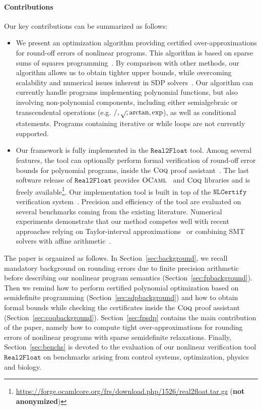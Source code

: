 \documentclass[preprint,fleqn,nocopyrightspace]{sigplanconf}
\newcommand{\realtofloat}{\mathtt{Real2Float}}
\newcommand{\coq}{\text{\sc Coq}}
\newcommand{\ocaml}{\text{\sc OCaml}}
\newcommand{\nlcertify}{\mathtt{NLCertify}}
\theoremstyle{plain}
\begin{document}
\paragraph{Contributions}
%
Our key contributions can be summarized as follows:
\begin{itemize}[noitemsep,nolistsep]
\item We present an optimization algorithm providing certified over-approximations for round-off errors of nonlinear programs. This algorithm is based on sparse sums of squares programming~\cite{Las06SparseSOS}. By comparison with other methods, our algorithm allows us to obtain tighter upper bounds, while overcoming scalability and numerical issues inherent in SDP solvers~\cite{Todd01semidefiniteoptimization}. Our algorithm can currently handle  programs implementing polynomial functions, but also involving non-polynomial components, including either semialgebraic or transcendental operations (e.g. $/, \sqrtsign, \arctan, \exp$), as well as conditional statements.  Programs containing iterative or while loops are not currently supported.
\item Our framework is fully implemented in the $\realtofloat$ tool.  Among several features, the tool can optionally perform formal verification of round-off error bounds for polynomial programs, inside the $\coq$ proof assistant~\cite{CoqProofAssistant}. The last software release of $\realtofloat$ provides $\ocaml$~\cite{OCaml} and $\coq$ libraries and is freely available\footnote{\url{https://forge.ocamlcore.org/frs/download.php/1526/real2float.tar.gz} (\textbf{not anonymized})}.
%
%
Our implementation tool is built in top of the $\nlcertify$ verification system~\cite{icms14}. Precision and efficiency of the tool are evaluated on several benchmarks coming from the existing literature. Numerical experiments demonstrate that our method competes well with recent approaches relying on Taylor-interval approximations~\cite{fptaylor15} or combining SMT solvers with affine arithmetic~\cite{Darulova14Popl}.
\end{itemize}
%


The paper is organized as follows.
%
In Section~\ref{sec:background}, we recall mandatory background on rounding errors due to finite precision arithmetic before describing our nonlinear program semantics (Section~\ref{sec:fpbackground}). Then we remind how to perform certified polynomial optimization based on semidefinite programming (Section~\ref{sec:sdpbackground}) and how to obtain formal bounds while checking the certificates inside the $\coq$ proof assistant (Section~\ref{sec:coqbackground}).
%
Section~\ref{sec:fpsdp} contains the main contribution of the paper, namely how to compute tight over-approximations for rounding errors of nonlinear programs with sparse semidefinite relaxations.
%
Finally, Section~\ref{sec:benchs} is devoted to the evaluation of our nonlinear verification tool $\realtofloat$ on benchmarks arising from control systems, optimization, physics and biology.
\vspace*{-0.2cm}
\end{document}
